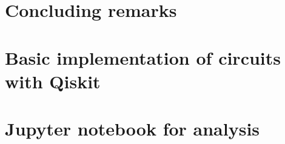 \documentclass[twoside]{report}
\begin{document}
 \chapter{Concluding remarks}
 \label{chap:conlusion}
 
  \begin{appendices}
    \chapter{Basic implementation of circuits with Qiskit}
    \label{chap:app1}
      
    \chapter{Jupyter notebook for analysis}
    \label{chap:app2}
    
  \end{appendices}
  \printbibliography
\end{document}
